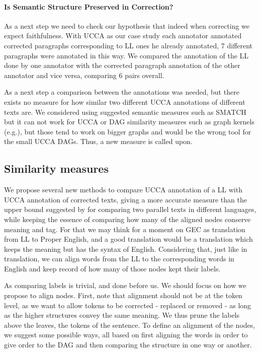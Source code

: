 \documentclass[english]{article}
\begin{document}
\paragraph{Is Semantic Structure Preserved in Correction?}

As a next step we need to check our hypothesis that indeed when correcting we
expect faithfulness. With UCCA as our case study each annotator annotated
corrected paragraphs corresponding to LL ones he already annotated,
7 different paragraphs were annotated in this way. 
We compared the annotation of the LL done by one annotator
with the corrected
paragraph annotation of the other annotator and vice versa, comparing 6 pairs overall. 

As a next step a comparison between the annotations was needed, but
there exists no measure for how similar two different UCCA annotations
of different texts are. We considered using suggested semantic measures
such as SMATCH\cite{cai2013smatch} but it can not work for UCCA or
DAG similarity measures such as graph kernels (e.g.\cite{kashima2003marginalized}),
but those tend to work on bigger graphs and would be the wrong tool
for the small UCCA DAGs. Thus, a new measure is called upon.

\subsection{Similarity measures\label{subsec:Similarity-measures}}

We propose several new methods to compare UCCA annotation of a LL with UCCA annotation of corrected texts, giving a more accurate
measure than the upper bound suggested by \cite{sulem2015conceptual}for
comparing two parallel texts in different languages, while keeping
the essence of comparing how many of the aligned nodes conserve meaning
and tag. For that we may think for a moment on GEC as
translation from LL to Proper English, and a good translation
would be a translation which keeps the meaning but has the syntax
of English. Considering that, just like in translation, we can align
words from the LL to the corresponding words in English
and keep record of how many of those nodes kept their labels.

As comparing labels is trivial, and done before us. We should focus on how we propose to
align nodes. First, note that alignment should not be at
the token level, as we want to allow tokens to be corrected - replaced or removed -
as long as the higher structures convey the same meaning. We thus
prune the labels above the leaves, the tokens of the sentence. To
define an alignment of the nodes, we suggest some possible ways, all
based on first aligning the words in order to give order to the DAG
and then comparing the structure in one way or another.
\end{document}
